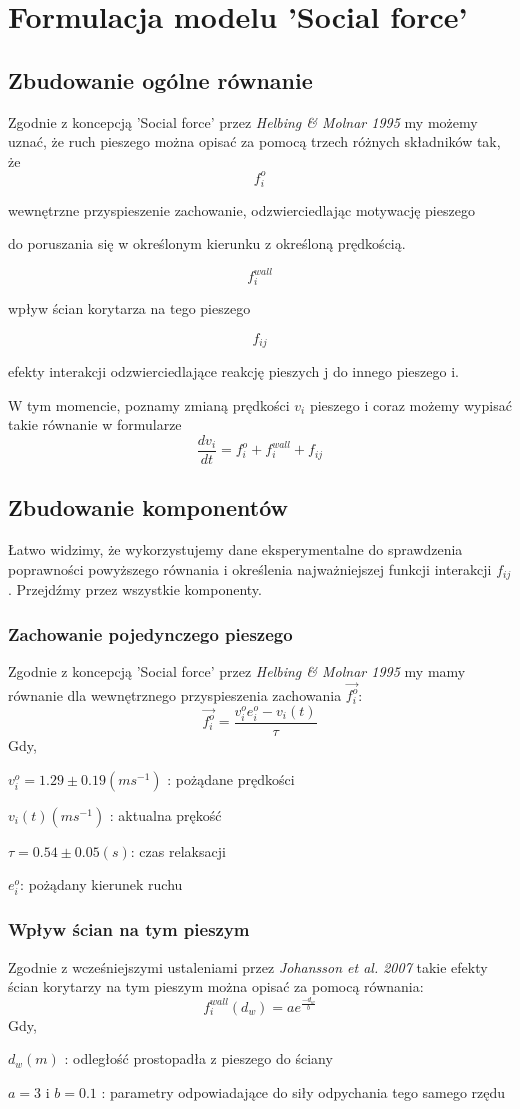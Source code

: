 \chapter{Formulacja modelu 'Social force'}
\section{Zbudowanie ogólne równanie}
\hspace{4ex}Zgodnie z koncepcją 'Social force' przez {\it Helbing \& Molnar 1995} my możemy uznać, że ruch pieszego można opisać za pomocą trzech różnych składników tak, że 
$$f_{i}^{o}$$  \centerline{wewnętrzne przyspieszenie zachowanie, odzwierciedlając motywację pieszego} \centerline{do poruszania się w określonym kierunku z określoną prędkością.} 
$$f_{i}^{wall}$$ \centerline{wpływ ścian korytarza na tego pieszego}
$$f_{ij}$$ \centerline{efekty interakcji odzwierciedlające reakcję pieszych j do innego pieszego i.}
\par \medskip W tym momencie, poznamy zmianą prędkości $v_{i}$ pieszego i coraz możemy wypisać takie równanie w formularze
$$
\frac{dv_{i}}{dt} = f_{i}^{o} + f_{i}^{wall} + f_{ij}
$$
\section{Zbudowanie komponentów}
\hspace{4ex}Łatwo widzimy, że wykorzystujemy dane eksperymentalne do sprawdzenia poprawności powyższego równania i określenia najważniejszej funkcji interakcji $f_{ij}$. Przejdźmy przez wszystkie komponenty.
\subsection{Zachowanie pojedynczego pieszego}
\hspace{4ex}Zgodnie z koncepcją 'Social force' przez {\it Helbing \& Molnar 1995} my mamy równanie dla wewnętrznego przyspieszenia zachowania $\vec{f_i^o}$:
$$\vec{f_{i}^{o}} = \frac{v_i^oe_i^o-v_{i}(t)}{\tau}$$
Gdy,\\ \centerline{$v_i^o = 1.29 \pm 0.19(ms^{-1})$ : pożądane prędkości}
\centerline{$v_i(t) (ms^{-1})$ : aktualna prękość}
\centerline{$\tau = 0.54 \pm 0.05(s)$: czas relaksacji}
\centerline{$e_i^o$: pożądany kierunek ruchu}
\subsection{Wpływ ścian na tym pieszym}
\hspace{4ex}Zgodnie z wcześniejszymi ustaleniami przez {\it Johansson et al. 2007} takie efekty ścian korytarzy na tym pieszym można opisać za pomocą równania:
$$
f_i^{wall}(d_w) = ae^{\frac{-d_w}{b}}
$$
Gdy, \\
\centerline{$d_w (m)$ : odległość prostopadła z pieszego do ściany}
\centerline{$a = 3$ i $b = 0.1$ : parametry odpowiadające do siły odpychania tego samego rzędu}
